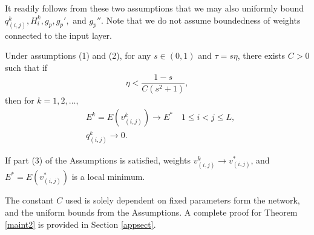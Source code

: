 \documentclass{jcmlatex}
\begin{document}
It readily follows from these two assumptions that we may also uniformly bound  $q_{(i,j)}^k, H_i^k,g_p, g_p',$ and  $g_p''$.  Note that we do not assume boundedness of weights connected to the input layer.

\begin{theorem}\label{maint2}
Under assumptions (1) and (2), for any $s \in (0,1)$ and  $\tau = s\eta$, there exists $C>0$ such that if
\begin{equation}
\eta < \frac{1-s}{C(s^2+1)},
\end{equation}
then for $k = 1,2,\dots$,
\begin{align}
&E^k = E(v_{(i,j)}^k ) \rightarrow E^* \quad 1\le i<j\le L,\\
&q^k_{(i,j)} \rightarrow 0.
\end{align}

If part (3) of the Assumptions is satisfied, weights $v_{(i,j)}^k\rightarrow v_{(i,j)}^*$, and $E^* = E(v_{(i,j)}^*)$ is a local  minimum.
\end{theorem}

The constant $C$ used is solely dependent on fixed parameters form the network, and the uniform bounds from the Assumptions. A complete proof for Theorem \ref{maint2} is provided in Section \ref{appsect}.

\end{document}
